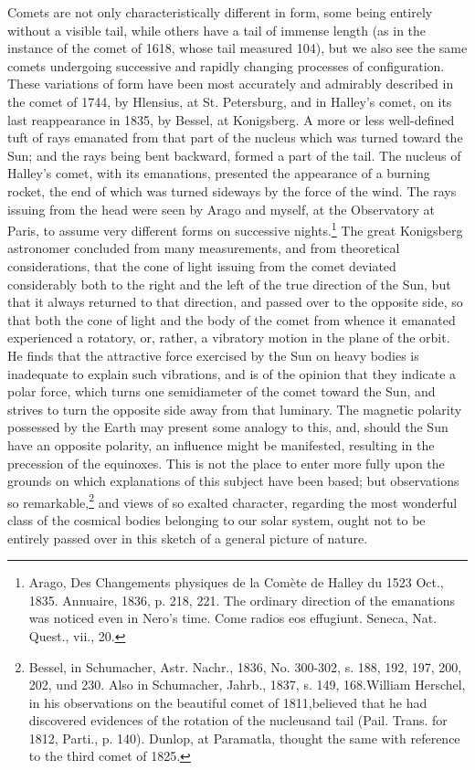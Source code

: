 Comets are not only characteristically different in form, some being entirely without a visible tail, while others have a tail of immense length (as in the instance of the comet of 1618, whose tail measured 104), but we also see the same comets undergoing successive and rapidly changing processes of configuration. These variations of form have been most accurately and admirably described in the comet of 1744, by Hlensius, at St. Petersburg, and in Halley's comet, on its last reappearance in 1835, by Bessel, at Konigsberg. A more or less well-defined tuft of rays emanated from that part of the nucleus which was turned toward the Sun; and the rays being bent backward, formed a part of the tail. The nucleus of Halley's comet, with its emanations, presented the appearance of a burning rocket, the end of which was turned sideways by the force of the wind. The rays issuing from the head were seen by Arago and myself, at the Observatory at Paris, to assume very different forms on successive nights.\footnote{Arago, Des Changements physiques de la Comète de Halley du 1523 Oct., 1835. Annuaire, 1836, p. 218, 221. The ordinary direction of the emanations was noticed even in Nero's time. Come radios eos effugiunt. Seneca, Nat. Quest., vii., 20.} The great Konigsberg astronomer concluded from many measurements, and from theoretical considerations, that the cone of light issuing from the comet deviated considerably both to the right and the left of the true direction of the Sun, but that it always returned to that direction, and passed over to the opposite side, so that both the cone of light and the body of the comet from whence it emanated experienced a rotatory, or, rather, a vibratory motion in the plane of the orbit. He finds that the attractive force exercised by the Sun on heavy bodies is inadequate to explain such vibrations, and is of the opinion that they indicate a polar force, which turns one semidiameter of the comet toward the Sun, and strives to turn the opposite side away from that luminary. The magnetic polarity possessed by the Earth may present some analogy to this, and, should the Sun have an opposite polarity, an influence might be manifested, resulting in the precession of the equinoxes. This is not the place to enter more fully upon the grounds on which explanations of this subject have been based; but observations so remarkable,\footnote{Bessel, in Schumacher, Astr. Nachr., 1836, No. 300-302, s. 188, 192, 197, 200, 202, und 230. Also in Schumacher, Jahrb., 1837, s. 149, 168.William Herschel, in his observations on the beautiful comet of 1811,believed that he had discovered evidences of the rotation of the nucleusand tail (Pail. Trans. for 1812, Parti., p. 140). Dunlop, at Paramatla, thought the same with reference to the third comet of 1825.} and views of so exalted character, regarding the most wonderful class of the cosmical bodies belonging to our solar system, ought not to be entirely passed over in this sketch of a general picture of nature.


